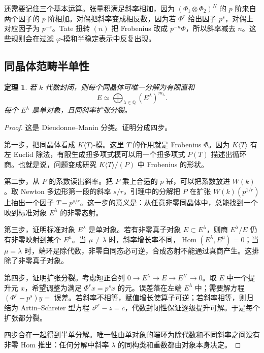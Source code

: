\documentclass[11pt,a4paper,openany]{ctexbook}
\numberwithin{equation}{chapter}
\newcommand{\Q}{\mathbb{Q}}
\newcommand{\Hom}{\operatorname{Hom}}
\theoremstyle{plain}
\newtheorem{theorem}{定理}[chapter]
\theoremstyle{definition}
\theoremstyle{remark}
\begin{document}
还需要记住三个基本运算。张量积满足斜率相加，因为 $(\Phi_1\otimes\Phi_2)^N$ 的 $p$ 阶来自两个因子的 $p$ 阶相加。对偶把斜率变成相反数，因为若 $\Phi^r$ 给出因子 $p^s$，对偶上对应因子为 $p^{-s}$。Tate 扭转 $(n)$ 把 Frobenius 改成 $p^{-n}\Phi$，所以斜率减去 $n$。这些规则会在过滤 $\varphi$-模和半稳定表示中反复出现。

\subsection{同晶体范畴半单性}

\begin{theorem}
若 $k$ 代数封闭，则每个同晶体可唯一分解为有限直和
\[
  E\simeq \bigoplus_{\lambda\in\Q} (E^\lambda)^{m_\lambda}.
\]
每个 $E^\lambda$ 是单对象，且同斜率扩张分裂。
\end{theorem}

\begin{proof}
这是 Dieudonne--Manin 分类。证明分成四步。

第一步，把同晶体看成 $K\langle T\rangle$-模。这里 $T$ 的作用就是 Frobenius $\Phi$。因为 $K\langle T\rangle$ 有左 Euclid 除法，有限生成扭多项式模可以用一个扭多项式 $P(T)$ 描述出循环商。也就是说，问题变成研究 $K\langle T\rangle/(P)$ 中 Frobenius 的形状。

第二步，从 $P$ 的系数读出斜率。把 $P$ 乘上合适的 $p$ 幂，可以把系数放进 $W(k)$。取 Newton 多边形第一段的斜率 $s/r$，引理中的分解把 $P$ 在扩张 $W(k)(p^{1/r})$ 上抽出一个因子 $T-p^{s/r}$。这一步的意义是：从任意非零同晶体中，总能找到一个映到标准对象 $E^\lambda$ 的非零态射。

第三步，证明标准对象 $E^\lambda$ 是单对象。若有非零真子对象 $E\subset E^\lambda$，则商 $E^\lambda/E$ 仍有非零映射到某个 $E^\mu$。当 $\mu\ne\lambda$ 时，斜率增长率不同，$\Hom(E^\lambda,E^\mu)=0$；当 $\mu=\lambda$ 时，端环是除代数，非零自同态必可逆，合成态射不能通过真商产生。这排除了非零真子对象。

第四步，证明扩张分裂。考虑短正合列 $0\to E^\lambda\to E\to E^{\lambda'}\to0$。取 $E$ 中一个提升元 $x$，希望调整为满足 $\Phi^r x=p^s x$ 的元。误差落在左端 $E^\lambda$ 中；需要解方程 $(\Phi^r-p^s)y=$ 误差。若斜率不相等，赋值增长使算子可逆；若斜率相等，则归结为 Artin--Schreier 型方程 $z^{p^a}-z=c$，代数封闭性保证逐级提升可解。于是每个扩张都分裂。

四步合在一起得到半单分解。唯一性由单对象的端环为除代数和不同斜率之间没有非零 Hom 推出：任何分解中斜率 $\lambda$ 的同构类和重数都由对象本身决定。
\end{proof}
\end{document}
